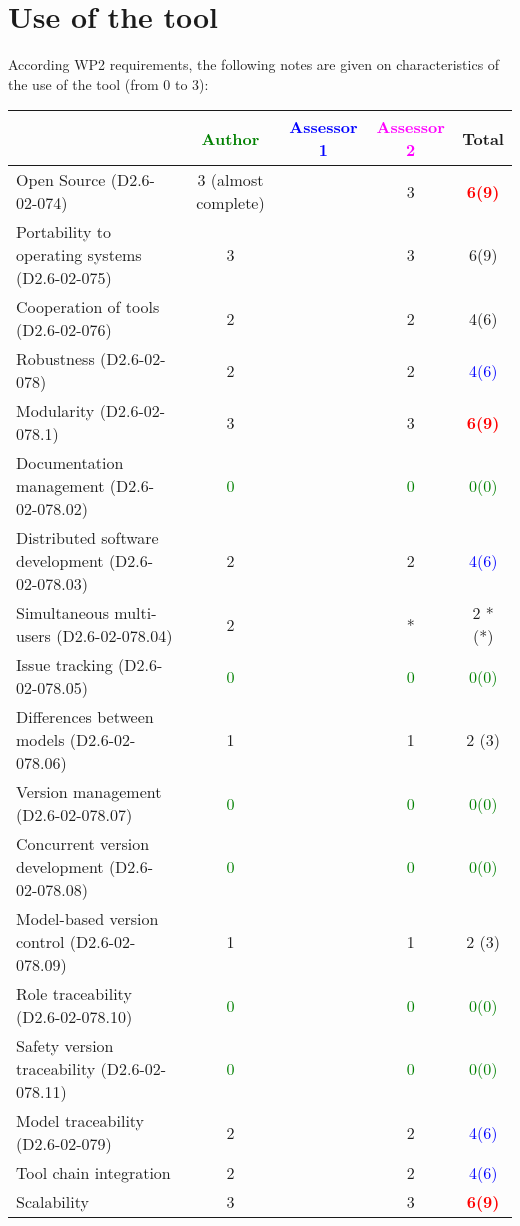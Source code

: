 \section{Use of the tool}


According WP2 requirements, the following notes are given on characteristics of the use of the tool (from 0 to 3):

\begin{tabular}{|l | c | c | c | c|}
\hline
& \textcolor{green}{Author} & \textcolor{blue}{Assessor 1} & \textcolor{magenta}{Assessor 2} & Total \\
\hline 
Open Source (D2.6-02-074) & 3     (almost complete)& & 3     & \textcolor{red}{\textbf{6(9)}}  \\
\hline 
Portability to operating systems (D2.6-02-075) & 3     & & 3     &  6(9) \\
\hline
Cooperation of tools (D2.6-02-076) & 2     & & 2     &  4(6) \\
\hline
Robustness (D2.6-02-078) & 2     & & 2     & \textcolor{blue}{4(6)}  \\
\hline
Modularity (D2.6-02-078.1) & 3     & & 3     & \textcolor{red}{\textbf{6(9)}}  \\
\hline
Documentation management (D2.6-02-078.02) & \textcolor{green}{0} & & \textcolor{green}{0} & \textcolor{green}{0(0)}  \\
\hline
Distributed software development (D2.6-02-078.03)  & 2     & & 2     & \textcolor{blue}{4(6)}  \\
\hline
Simultaneous multi-users (D2.6-02-078.04)   & 2     & & * & 2 *(*) \\
\hline
Issue tracking (D2.6-02-078.05) & \textcolor{green}{0} & & \textcolor{green}{0} & \textcolor{green}{0(0)}  \\
\hline
Differences between models (D2.6-02-078.06) & 1     & & 1     & 2 (3) \\
\hline
Version management (D2.6-02-078.07) & \textcolor{green}{0} & & \textcolor{green}{0} & \textcolor{green}{0(0)}  \\
\hline
Concurrent version development (D2.6-02-078.08) & \textcolor{green}{0} & & \textcolor{green}{0} & \textcolor{green}{0(0)}  \\
\hline
Model-based version control (D2.6-02-078.09) & 1     & & 1     & 2 (3) \\
\hline
Role traceability (D2.6-02-078.10) & \textcolor{green}{0} & & \textcolor{green}{0} & \textcolor{green}{0(0)}  \\
\hline
Safety version traceability (D2.6-02-078.11) & \textcolor{green}{0} & & \textcolor{green}{0} & \textcolor{green}{0(0)}  \\
\hline
Model traceability (D2.6-02-079) & 2     & & 2     & \textcolor{blue}{4(6)}  \\
\hline
Tool chain integration & 2     & & 2     & \textcolor{blue}{4(6)}  \\
\hline
Scalability & 3     & & 3     & \textcolor{red}{\textbf{6(9)}}  \\
\hline
\end{tabular}


